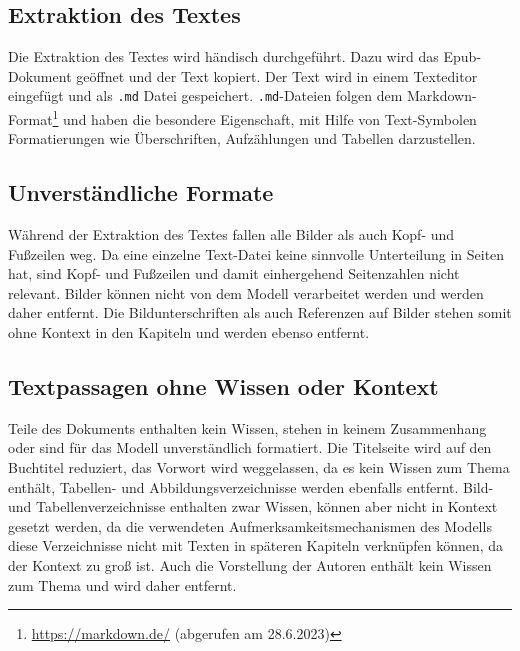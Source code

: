\subsection{Extraktion des Textes}
Die Extraktion des Textes wird händisch durchgeführt.
Dazu wird das Epub-Dokument geöffnet und der Text kopiert.
Der Text wird in einem Texteditor eingefügt und als \texttt{.md} Datei gespeichert.
\texttt{.md}-Dateien folgen dem Markdown-Format\footnote{\url{https://markdown.de/} (abgerufen am 28.6.2023)} und haben die besondere Eigenschaft, mit Hilfe von Text-Symbolen Formatierungen wie Überschriften, Aufzählungen und Tabellen darzustellen.

\subsection{Unverständliche Formate}
Während der Extraktion des Textes fallen alle Bilder als auch Kopf- und Fußzeilen weg.
Da eine einzelne Text-Datei keine sinnvolle Unterteilung in Seiten hat, sind Kopf- und Fußzeilen und damit einhergehend Seitenzahlen nicht relevant.
Bilder können nicht von dem Modell verarbeitet werden und werden daher entfernt.
Die Bildunterschriften als auch Referenzen auf Bilder stehen somit ohne Kontext in den Kapiteln und werden ebenso entfernt.

\subsection{Textpassagen ohne Wissen oder Kontext}
Teile des Dokuments enthalten kein Wissen, stehen in keinem Zusammenhang oder sind für das Modell unverständlich formatiert.
Die Titelseite wird auf den Buchtitel reduziert, das Vorwort wird weggelassen, da es kein Wissen zum Thema enthält, Tabellen- und Abbildungsverzeichnisse werden ebenfalls entfernt.
Bild- und Tabellenverzeichnisse enthalten zwar Wissen, können aber nicht in Kontext gesetzt werden, da die verwendeten Aufmerksamkeitsmechanismen des Modells diese Verzeichnisse nicht mit Texten in späteren Kapiteln verknüpfen können, da der Kontext zu groß ist.
Auch die Vorstellung der Autoren enthält kein Wissen zum Thema und wird daher entfernt.

